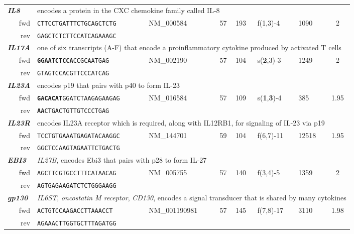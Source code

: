 \documentclass[12pt]{scrreprt} %
\begin{document}
\begin{table}[htbp]
{\begin{tabular}{rllclllc}
\hline \multicolumn{1}{l}{\textit{\textbf{IL8}}} & \multicolumn{7}{l}{encodes a protein in the CXC chemokine family called IL-8} \\ 
\ fwd & \texttt{CTTCCTGATTTCTGCAGCTCTG} & NM\_000584 & 57 & 193 & f(1,3)-4 & 1090 & 2 \\ 
\ rev & \texttt{GAGCTCTCTTCCATCAGAAAGC} &  &  &  &  &  &  \\ 
\hline \multicolumn{1}{l}{\textit{\textbf{IL17A}}} & \multicolumn{7}{l}{one of six transcripts (A-F) that encode a proinflammatory cytokine produced by activated T cells} \\ 
\ fwd & \texttt{\textbf{GGAATCTCCA}CCGCAATGAG} & NM\_002190 & 57 & 104 & s(\textbf{2},3)-3 & 1249 & 2 \\ 
\ rev & \texttt{GTAGTCCACGTTCCCATCAG} &  &  &  &  &  &  \\ 
\hline \multicolumn{1}{l}{\textit{\textbf{IL23A}}} & \multicolumn{7}{l}{encodes p19    that pairs with p40 to form IL-23} \\ 
\ fwd & \texttt{\textbf{GACACAT}GGATCTAAGAGAAGAG} & NM\_016584 & 57 & 109  & s(\textbf{1},\textbf{3})-4 & 385 & 1.95 \\ 
\ rev & \texttt{\textbf{AA}CTGACTGTTGTCCCTGAG} &  &  &  &  &  &  \\ 
\hline \multicolumn{1}{l}{\textit{\textbf{IL23R}}} & \multicolumn{7}{l}{encodes IL23A receptor which is required, along with IL12RB1, for signaling of IL-23 via p19} \\ 
\ fwd & \texttt{TCCTGTGAAATGAGATACAAGGC} & NM\_144701 & 59 & 104 & f(6,7)-11 & 12518 & 1.95 \\ 
\ rev & \texttt{GGCTCCAAGTAGAATTCTGACTG} &  &  &  &  &  &  \\ 
\hline \multicolumn{1}{l}{\textit{\textbf{EBI3}}} & \multicolumn{7}{l}{\textit{IL27B}, encodes Ebi3 that pairs with p28 to form IL-27} \\ 
\ fwd & \texttt{AGCTTCGTGCCTTTCATAACAG} & NM\_005755 & 57 & 140 & f(3,4)-5 & 1359 & 2 \\ 
\ rev & \texttt{AGTGAGAAGATCTCTGGGAAGG} &  &  &  &  &  &  \\ 
\hline \multicolumn{1}{l}{\textit{\textbf{gp130}}} & \multicolumn{7}{l}{\textit{IL6ST}, \textit{oncostatin M receptor}, \textit{CD130}, encodes a signal transducer that is shared by many cytokines} \\ 
\ fwd & \texttt{ACTGTCCAAGACCTTAAACCT} & NM\_001190981 & 57 & 145 & f(7,8)-17 & 3110 & 1.98 \\ 
\ rev & \texttt{AGAAACTTGGTGCTTTAGATGG} &  &  &  &  &  &  \\ 

\end{tabular}}
\end{table}
\end{document}
